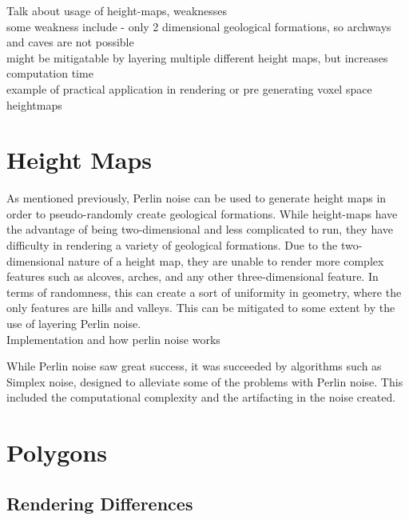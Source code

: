 \documentclass[12pt]{report}
\begin{document}
		
		\noindent Talk about usage of height-maps, weaknesses\\
		some weakness include - only 2 dimensional geological formations, so archways and caves are not possible \\
		might be mitigatable by layering multiple different height maps, but increases computation time\\
		example of practical application in rendering or pre generating voxel space heightmaps \\
	
	\let\clearpage\relax
	\chapter{Height Maps}
	
		As mentioned previously, Perlin noise can be used to generate height maps in order to pseudo-randomly create geological formations. While height-maps have the advantage of being two-dimensional and less complicated to run, they have difficulty in rendering a variety of geological formations. Due to the two-dimensional nature of a height map, they are unable to render more complex features such as alcoves, arches, and any other three-dimensional feature. In terms of randomness, this can create a sort of uniformity in geometry, where the only features are hills and valleys. This can be mitigated to some extent by the use of layering Perlin noise. \\
		
		Implementation and how perlin noise works
		
		While Perlin noise saw great success, it was succeeded by algorithms such as Simplex noise, designed to alleviate some of the problems with Perlin noise. This included the computational complexity and the artifacting in the noise created. \\
		
		
	\let\clearpage\relax
	\chapter{Polygons}
	
		\section{Rendering Differences}
		
\end{document}
